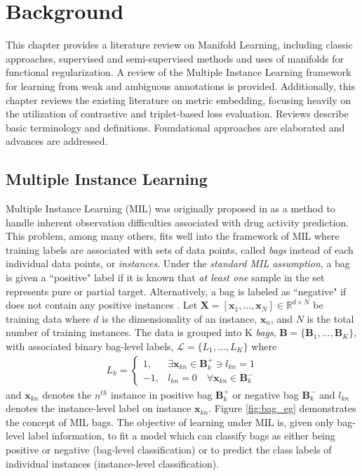\chapter{Background}

This chapter provides a literature review on Manifold Learning, including classic approaches, supervised and semi-supervised methods and uses of manifolds for functional regularization.  A review of the Multiple Instance Learning framework for learning from weak and ambiguous annotations is provided. Additionally, this chapter reviews the existing literature on metric embedding, focusing heavily on the utilization of contrastive and triplet-based loss evaluation.  Reviews describe basic terminology and definitions.  Foundational approaches are elaborated and advances are addressed.

\section{Multiple Instance Learning}

Multiple Instance Learning (MIL) was originally proposed in \cite{Dietterich1996AxisParallelRectangles} as a method to handle inherent observation difficulties associated with drug activity prediction.  This problem, among many others, fits well into the framework of MIL where training labels are associated with sets of data points, called \textit{bags} instead of each individual data points, or \textit{instances}.  Under the \textit{standard MIL assumption}, a bag is given a ``positive" label if it is known that  \textit{at least one} sample in the set represents pure or partial target.  Alternatively, a bag is labeled as ``negative" if does not contain any positive instances \cite{Carbonneau2016MILSurvey}.  Let $\bm{X}=[\bm{x}_1,\dots, \bm{x}_N] \in \mathbb{R}^{d \times N}$ be training data where $d$ is the dimensionality of an instance, $\bm{x}_n$, and $N$ is the total number of training instances.  The data is grouped into K \textit{bags}, $\bm{B} = \{\bm{B}_1, \dots, \bm{B}_K\}$, with associated binary bag-level labels, $\mathcal{L} = \{L_1, \dots, L_K \}$ where 
\begin{align}
	L_k = \begin{cases} 
	1, & \exists \bm{x}_{kn} \in \bm{B}^{+}_{k} \ni  l_{kn} = 1\\
	-1, & l_{kn} = 0 \quad \forall \bm{x}_{kn} \in \bm{B}^{-}_{k} 
	\end{cases}
\end{align} and $\bm{x}_{kn}$ denotes the $n^{th}$ instance in positive bag $\bm{B}^{+}_{k}$ or negative bag $\bm{B}^{-}_{k}$ \cite{Zare2016MIACE} and $l_{kn}$ denotes the instance-level label on instance $\bm{x}_{kn}$.  Figure \ref{fig:bag_eg} demonstrates the concept of MIL bags.  The objective of learning under MIL is, given only bag-level label information, to fit a model which can classify bags as either being positive or negative (bag-level classification) or to predict the class labels of individual instances (instance-level classification).


